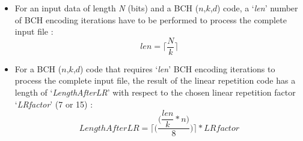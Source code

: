 	\begin{itemize}
		\item For an input data of length \emph{N} (bits) and a BCH ($n$,$k$,$d$) code, a ‘\emph{len}’ number of BCH encoding iterations have to be performed to process the complete input file \cite{71}:
	\begin{equation}
		len =\Bigg\lceil\dfrac{N}{k}\Bigg\rceil
		\label{4:BCH_len}
	\end{equation}

	\item For a BCH ($n$,$k$,$d$) code that requires ‘\emph{len}’ BCH encoding iterations to process the complete input file, the result of the linear repetition code has a length of ‘\emph{LengthAfterLR}’ with respect to the chosen linear repetition factor ‘\emph{LRfactor}’ (7 or 15) \cite{71}:
	\begin{equation}
		LengthAfterLR = \Bigg\lceil\Bigg(\dfrac{\Bigg(\dfrac{len}{k} * n\Bigg)}{8}\Bigg)\Bigg\rceil * LRfactor
	\label{4:BCH_LR_len}
	\end{equation}
	\end{itemize}

